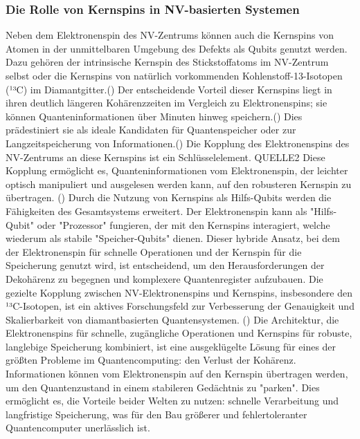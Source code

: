 \subsubsection{Die Rolle von Kernspins in NV-basierten Systemen}
Neben dem Elektronenspin des NV-Zentrums können auch die Kernspins von Atomen in der unmittelbaren Umgebung des Defekts als Qubits genutzt werden. Dazu gehören der intrinsische Kernspin des Stickstoffatoms im NV-Zentrum selbst oder die Kernspins von natürlich vorkommenden Kohlenstoff-13-Isotopen (¹³C) im Diamantgitter.(\cite{QuantenSpeicherMitLangzeitgedaechtnis})
Der entscheidende Vorteil dieser Kernspins liegt in ihren deutlich längeren Kohärenzzeiten im Vergleich zu Elektronenspins; sie können Quanteninformationen über Minuten hinweg speichern.(\cite{QuantenSpeicherMitLangzeitgedaechtnis}) Dies prädestiniert sie als ideale Kandidaten für Quantenspeicher oder zur Langzeitspeicherung von Informationen.(\cite{QuantenSpeicherMitLangzeitgedaechtnis}) Die Kopplung des Elektronenspins des NV-Zentrums an diese Kernspins ist ein Schlüsselelement. QUELLE2 Diese Kopplung ermöglicht es, Quanteninformationen vom Elektronenspin, der leichter optisch manipuliert und ausgelesen werden kann, auf den robusteren Kernspin zu übertragen. (\cite{QuantenSpeicherMitLangzeitgedaechtnis})
Durch die Nutzung von Kernspins als Hilfs-Qubits werden die Fähigkeiten des Gesamtsystems erweitert. Der Elektronenspin kann als "Hilfs-Qubit" oder "Prozessor" fungieren, der mit den Kernspins interagiert, welche wiederum als stabile "Speicher-Qubits" dienen. Dieser hybride Ansatz, bei dem der Elektronenspin für schnelle Operationen und der Kernspin für die Speicherung genutzt wird, ist entscheidend, um den Herausforderungen der Dekohärenz zu begegnen und komplexere Quantenregister aufzubauen. Die gezielte Kopplung zwischen NV-Elektronenspins und Kernspins, insbesondere den ¹³C-Isotopen, ist ein aktives Forschungsfeld zur Verbesserung der Genauigkeit und Skalierbarkeit von diamantbasierten Quantensystemen. (\cite{QuantenSpeicherMitLangzeitgedaechtnis})
Die Architektur, die Elektronenspins für schnelle, zugängliche Operationen und Kernspins für robuste, langlebige Speicherung kombiniert, ist eine ausgeklügelte Lösung für eines der größten Probleme im Quantencomputing: den Verlust der Kohärenz. Informationen können vom Elektronenspin auf den Kernspin übertragen werden, um den Quantenzustand in einem stabileren Gedächtnis zu "parken". Dies ermöglicht es, die Vorteile beider Welten zu nutzen: schnelle Verarbeitung und langfristige Speicherung, was für den Bau größerer und fehlertoleranter Quantencomputer unerlässlich ist.
